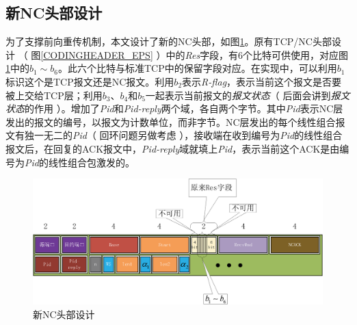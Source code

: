 \subsection{新NC头部设计}\label{sec:newnc}
为了支撑前向重传机制，本文设计了新的NC头部，如图\ref{NEWHEADER_EPS}。原有TCP/NC头部设计 （ 图\ref{CODINGHEADER_EPS} ）中的\emph{Res}字段，有6个比特可供使用，对应图\ref{NEWHEADER_EPS}中的$b_1 \sim b_6$。此六个比特与标准TCP中的保留字段对应。在实现中，可以利用$b_1$标识这个是TCP报文还是NC报文。利用$b_2$表示\emph{R-flag}，表示当前这个报文是否要被上交给TCP层；利用$b_3$、$b_4$和$b_5$一起表示当前报文的\emph{报文状态}（ 后面会讲到\emph{报文状态}的作用 ）。增加了\emph{Pid}和\emph{Pid-reply}两个域，各自两个字节。其中\emph{Pid}表示NC层发出的报文的编号，以报文为计数单位，而非字节。NC层发出的每个线性组合报文有独一无二的\emph{Pid}（ 回环问题另做考虑 ），接收端在收到编号为\emph{Pid}的线性组合报文后，在回复的ACK报文中，\emph{Pid-reply}域就填上\emph{Pid}，表示当前这个ACK是由编号为\emph{Pid}的线性组合包激发的。
\begin{figure}[htbp]
	\centering
	\includegraphics[width=6in]{figures/newheader.eps}
	\caption{新NC头部设计}
	\label{NEWHEADER_EPS}
\end{figure}

